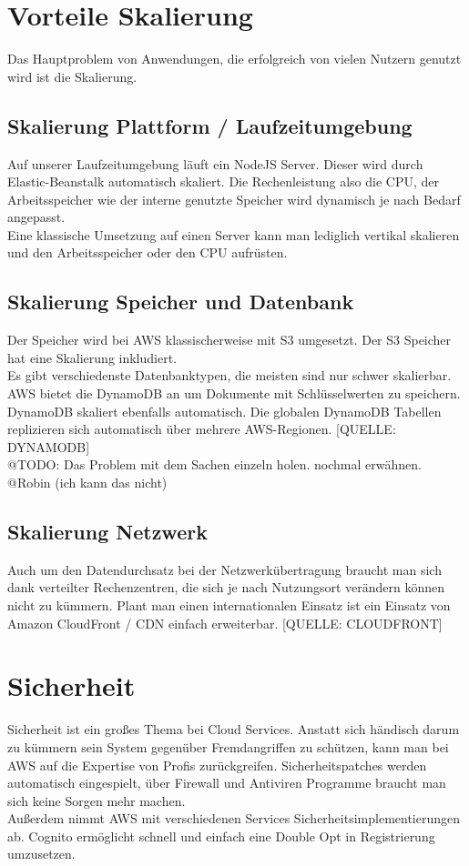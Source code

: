 \documentclass[a4paper, 12pt]{scrreprt}
\begin{document}
\section{Vorteile Skalierung}
Das Hauptproblem von Anwendungen, die erfolgreich von vielen Nutzern genutzt wird ist die Skalierung.
\subsection{Skalierung Plattform / Laufzeitumgebung}
Auf unserer Laufzeitumgebung läuft ein NodeJS Server. Dieser wird durch Elastic-Beanstalk automatisch skaliert. Die Rechenleistung also die CPU, der Arbeitsspeicher wie der interne genutzte Speicher wird dynamisch je nach Bedarf angepasst. \\
Eine klassische Umsetzung auf einen Server kann man lediglich vertikal skalieren und den Arbeitsspeicher oder den CPU aufrüsten. 
\subsection{Skalierung Speicher und Datenbank}
Der Speicher wird bei AWS klassischerweise mit S3 umgesetzt. Der S3 Speicher hat eine Skalierung inkludiert. \\
Es gibt verschiedenste Datenbanktypen, die meisten sind nur schwer skalierbar. AWS bietet die DynamoDB an um Dokumente mit Schlüsselwerten zu speichern. DynamoDB skaliert ebenfalls automatisch. Die globalen DynamoDB Tabellen replizieren sich automatisch über mehrere AWS-Regionen. [QUELLE: DYNAMODB] \\
@TODO: Das Problem mit dem Sachen einzeln holen. nochmal erwähnen. @Robin (ich kann das nicht)
\subsection{Skalierung Netzwerk}
Auch um den Datendurchsatz bei der Netzwerkübertragung  braucht man sich dank verteilter Rechenzentren, die sich je nach Nutzungsort verändern können nicht zu kümmern. Plant man einen internationalen Einsatz ist ein Einsatz von Amazon CloudFront / CDN einfach erweiterbar. [QUELLE: CLOUDFRONT]%
\section{Sicherheit}
Sicherheit ist ein großes Thema bei Cloud Services. Anstatt sich händisch darum zu kümmern sein System gegenüber Fremdangriffen zu schützen, kann man bei AWS auf die Expertise von Profis zurückgreifen. Sicherheitspatches werden automatisch eingespielt, über Firewall und Antiviren Programme braucht man sich keine Sorgen mehr machen. \\
Außerdem nimmt AWS mit verschiedenen Services Sicherheitsimplementierungen ab. Cognito ermöglicht schnell und einfach eine Double Opt in Registrierung umzusetzen.
\end{document}
